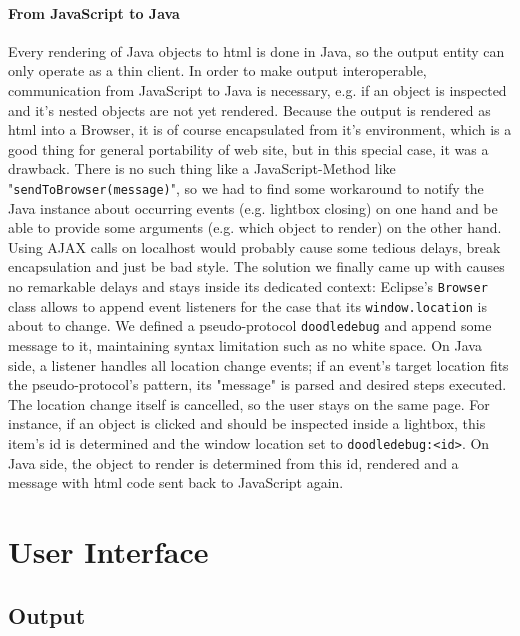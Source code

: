 \documentclass[a4paper,ngerman,english]{amsbook} %
\begin{document}
\subsubsection{From JavaScript to Java}
Every rendering of Java objects to html is done in Java, so the output entity can only operate as a thin client.
In order to make output interoperable, communication from JavaScript to Java is necessary, e.g. if an object is inspected and it's nested objects are not yet rendered. Because the output is rendered as html into a Browser, it is of course encapsulated from it's environment, which is a good thing for general portability of web site, but in this special case, it was a drawback. There is no such thing like a JavaScript-Method like "\verb.sendToBrowser(message).", so we had to find some workaround to notify the Java instance about occurring events (e.g. lightbox closing) on one hand and be able to provide some arguments (e.g. which object to render) on the other hand. Using AJAX calls on localhost would probably cause some tedious delays, break encapsulation and just be bad style. The solution we finally came up with causes no remarkable delays and stays inside its dedicated context: Eclipse's \verb.Browser. class allows to append event listeners for the case that its \verb-window.location- is about to change. We defined a pseudo-protocol \verb-doodledebug- and append some message to it, maintaining syntax limitation such as no white space. On Java side, a listener handles all location change events; if an event's target location fits the pseudo-protocol's pattern, its "message" is parsed and desired steps executed. The location change itself is cancelled, so the user stays on the same page. For instance, if an object is clicked and should be inspected inside a lightbox, this item's id is determined and the window location set to \verb-doodledebug:<id>-. On Java side, the object to render is determined from this id, rendered and a message with html code sent back to JavaScript again.

\chapter{User Interface}
\section{Output}
\end{document}
